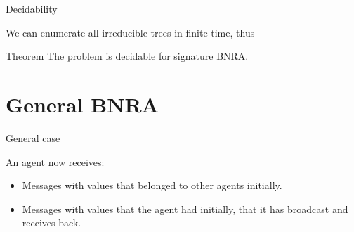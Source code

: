 \documentclass{beamer}
\begin{document}
\begin{frame}{Decidability}
	
	
	We can enumerate all irreducible trees in finite time, thus
	
	\begin{block}{Theorem}
		The {} problem is decidable for \color{blue}signature \color{black} BNRA.
	\end{block}
\end{frame}


\section{General BNRA}

\begin{frame}
	\tableofcontents[currentsection]
\end{frame}



\begin{frame}{General case}
	
	An agent now receives:
	\begin{itemize}
		\item Messages with values that belonged to other agents initially.\pause
		
		\item Messages with values that the agent had initially, that it has broadcast and receives back.
	\end{itemize}
\end{frame}
\end{document}
